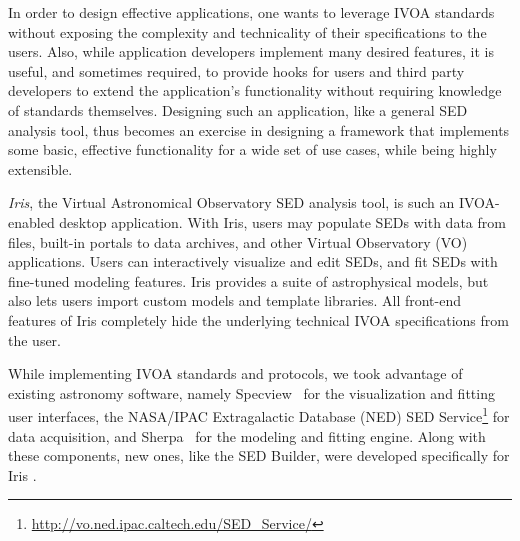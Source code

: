 \documentclass[preprint,authoryear,5p]{elsarticle}
\begin{document}
\begin{sloppypar}
In order to design effective applications, one wants
to leverage IVOA standards without exposing the complexity and
technicality of their specifications to the users. Also, while application
developers implement many desired features, it is useful, and sometimes 
required, to provide hooks for users and third party developers to extend
the application's functionality without requiring knowledge of standards themselves.
Designing such an application, like a general SED analysis tool, thus becomes an
exercise in designing a framework that implements some basic,
effective functionality for a wide set of use cases, while being highly extensible.
\bigskip

\textit{Iris}, the Virtual Astronomical Observatory \citep[VAO;][]{2012SPIE.8449E..0HB}
SED analysis tool, is such an IVOA-enabled desktop application. 
With Iris, users may populate SEDs with data from files, built-in portals to data
archives, and other Virtual Observatory (VO) applications. Users can
interactively visualize and edit SEDs, and fit SEDs with fine-tuned modeling
features. Iris provides a suite of astrophysical models, but also lets users
import custom models and template libraries. All front-end features
of Iris completely hide the underlying technical IVOA specifications from
the user.

While implementing IVOA standards and protocols, 
we took advantage of existing astronomy
software, namely
Specview~\citep{2002ASPC..281..120B} for the visualization and fitting user
interfaces, the NASA/IPAC Extragalactic Database (NED) SED 
Service\footnote{\url{http://vo.ned.ipac.caltech.edu/SED_Service/}} for data
acquisition, and Sherpa~\citep{2001SPIE.4477...76F,2009pysc.conf...51R} for the 
modeling and fitting engine. Along with these components, new ones, like the SED 
Builder, were developed specifically for Iris
\citep{2012ASPC..461..893D,2013AAS...22124038L}.
\end{sloppypar}


\end{document}

